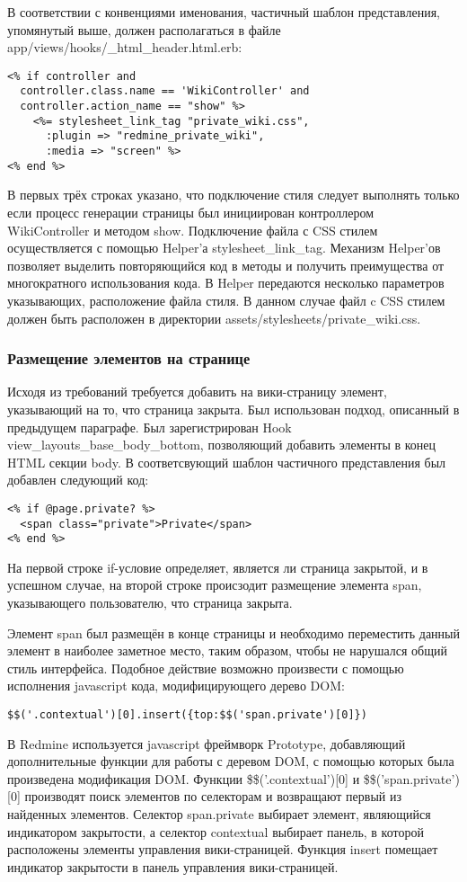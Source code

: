В соответствии с конвенциями именования, частичный шаблон представления,
упомянутый выше, должен располагаться в файле
app/views/hooks/\_html\_header.html.erb:
\small{\begin{lstlisting}
<% if controller and
  controller.class.name == 'WikiController' and
  controller.action_name == "show" %>
    <%= stylesheet_link_tag "private_wiki.css",
      :plugin => "redmine_private_wiki",
      :media => "screen" %>
<% end %>
\end{lstlisting}}
В первых трёх строках указано, что подключение стиля следует выполнять только
если процесс генерации страницы был инициирован контроллером WikiController и
методом show. Подключение файла с CSS стилем осуществляется с помощью Helper'а
stylesheet\_link\_tag. Механизм Helper'ов позволяет выделить повторяющийся код
в методы и получить преимущества от многократного использования кода. В Helper
передаются несколько параметров указывающих, расположение файла стиля. В
данном случае файл c CSS стилем должен быть расположен в директории
assets/stylesheets/private\_wiki.css.

\subsubsection{Размещение элементов на странице}
Исходя из требований требуется добавить на вики-страницу элемент, указывающий
на то, что страница закрыта. Был использован подход, описанный в предыдущем
параграфе. Был зарегистрирован Hook view\_layouts\_base\_body\_bottom,
позволяющий добавить элементы в конец HTML секции body. В соответсвующий шаблон
частичного представления был добавлен следующий код:
\small{\begin{lstlisting}
<% if @page.private? %>
  <span class="private">Private</span>
<% end %>
\end{lstlisting}}
На первой строке if-условие определяет, является ли страница закрытой, и в
успешном случае, на второй строке происзодит размещение элемента span,
указывающего пользователю, что страница закрыта.

Элемент span был размещён в конце страницы и необходимо переместить данный
элемент в наиболее заметное место, таким образом, чтобы не нарушался общий
стиль интерфейса. Подобное действие возможно произвести с помощью исполнения
javascript кода, модифицирующего дерево DOM:
\small{\begin{lstlisting}
$$('.contextual')[0].insert({top:$$('span.private')[0]})
\end{lstlisting}}
В Redmine используется javascript фреймворк Prototype, добавляющий
дополнительные функции для работы с деревом DOM, с помощью которых была
произведена модификация DOM. Функции \$\$('.contextual')[0] и 
\$\$('span.private')[0] производят поиск элементов по селекторам и возвращают
первый из найденных элементов. Селектор span.private выбирает элемент,
являющийся индикатором закрытости, а селектор contextual выбирает панель, в
которой расположены элементы управления вики-страницей. Функция insert помещает
индикатор закрытости в панель управления вики-страницей.


